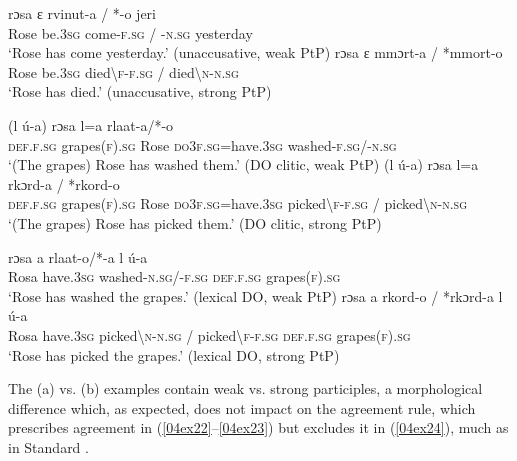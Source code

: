 \documentclass[output=paper,colorlinks,citecolor=brown]{langscibook}
\begin{document}
\noindent {}
\begin{exe}
	\ex \label{04ex22}
	\begin{xlist}
		\ex \gll rɔsa ɛ rvinut-a / *-o jeri \\
		Rose be.\textsc{3sg} come-\textsc{f.sg} / \textsc{-n.sg} yesterday \\
		\trans ‘Rose has come yesterday.’ \hfill (unaccusative, weak PtP)
		\ex \gll rɔsa ɛ mmɔrt-a / *mmort-o \\
		Rose be.\textsc{3sg} died\textbackslash \textsc{f}-\textsc{f.sg} / died\textbackslash \textsc{n}-\textsc{n.sg} \\
		\trans ‘Rose has died.’ \hfill (unaccusative, strong PtP)
	\end{xlist}
	
	\ex \label{04ex23}
	\begin{xlist}
		\ex \gll (l ú-a) rɔsa l{=}a rlaat-a/*-o \\
		\textsc{def.f.sg} grapes\textsc{(f).sg} Rose \textsc{do3f.sg}=have.\textsc{3sg} washed-\textsc{f.sg}/-\textsc{n.sg} \\
		\trans ‘(The grapes) Rose has washed them.’ \hfill (DO clitic, weak PtP)
		\ex \gll (l ú-a) rɔsa l{=}a rkɔrd-a / *rkord-o \\
		\textsc{def.f.sg} grapes\textsc{(f).sg} Rose \textsc{do3f.sg}=have.\textsc{3sg} picked\textbackslash \textsc{f-f.sg} / picked\textbackslash \textsc{n-n.sg} \\
		\trans ‘(The grapes) Rose has picked them.’ \hfill (DO clitic, strong PtP)
	\end{xlist}
	
	\ex \label{04ex24}
	\begin{xlist}
		\ex \gll rɔsa a rlaat-o/*-a l ú-a \\
		Rosa have.\textsc{3sg} washed-\textsc{n.sg}/-\textsc{f.sg} \textsc{def.f.sg} grapes\textsc{(f).sg} \\
		\trans ‘Rose has washed the grapes.’ \hfill (lexical DO, weak PtP)
		\ex \gll rɔsa a rkord-o / *rkɔrd-a l ú-a \\
		Rosa have.\textsc{3sg} picked\textbackslash \textsc{n-n.sg} / picked\textbackslash \textsc{f-f.sg} \textsc{def.f.sg} grapes\textsc{(f).sg} \\
		\trans ‘Rose has picked the grapes.’ \hfill (lexical DO, strong PtP)
	\end{xlist}
\end{exe}

The (a) vs. (b) examples contain weak vs. strong participles, a morphological difference which, as expected, does not impact on the agreement rule, which prescribes agreement in (\ref{04ex22}--\ref{04ex23}) but excludes it in (\ref{04ex24}), much as in Standard .
\end{document}
